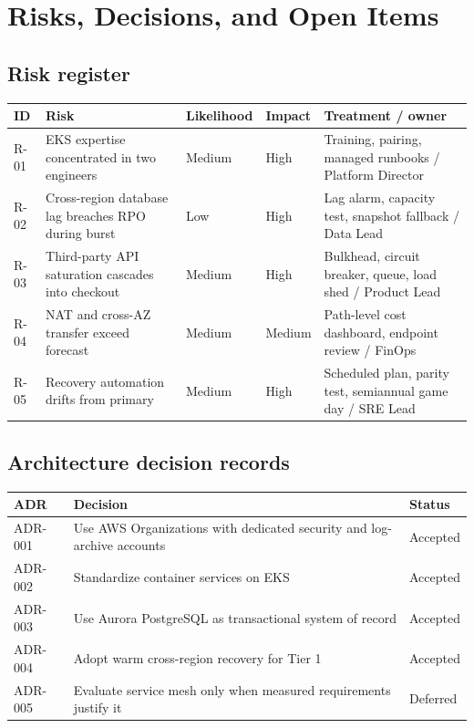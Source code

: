 \section{Risks, Decisions, and Open Items}

\subsection{Risk register}

\begin{tabularx}{\textwidth}{@{}C{13mm}Y C{19mm}C{19mm}Y@{}}
  \toprule
  \color{white}\textbf{ID} & \color{white}\textbf{Risk} & \color{white}\textbf{Likelihood} & \color{white}\textbf{Impact} & \color{white}\textbf{Treatment / owner} \\
  \midrule
  R-01 & EKS expertise concentrated in two engineers & Medium & High & Training, pairing, managed runbooks / Platform Director \\
  R-02 & Cross-region database lag breaches RPO during burst & Low & High & Lag alarm, capacity test, snapshot fallback / Data Lead \\
  R-03 & Third-party API saturation cascades into checkout & Medium & High & Bulkhead, circuit breaker, queue, load shed / Product Lead \\
  R-04 & NAT and cross-AZ transfer exceed forecast & Medium & Medium & Path-level cost dashboard, endpoint review / FinOps \\
  R-05 & Recovery automation drifts from primary & Medium & High & Scheduled plan, parity test, semiannual game day / SRE Lead \\
  \bottomrule
\end{tabularx}

\subsection{Architecture decision records}

\begin{tabularx}{\textwidth}{@{}L{20mm}Y L{30mm}@{}}
  \toprule
  \color{white}\textbf{ADR} & \color{white}\textbf{Decision} & \color{white}\textbf{Status} \\
  \midrule
  ADR-001 & Use AWS Organizations with dedicated security and log-archive accounts & Accepted \\
  ADR-002 & Standardize container services on EKS & Accepted \\
  ADR-003 & Use Aurora PostgreSQL as transactional system of record & Accepted \\
  ADR-004 & Adopt warm cross-region recovery for Tier 1 & Accepted \\
  ADR-005 & Evaluate service mesh only when measured requirements justify it & Deferred \\
  \bottomrule
\end{tabularx}

